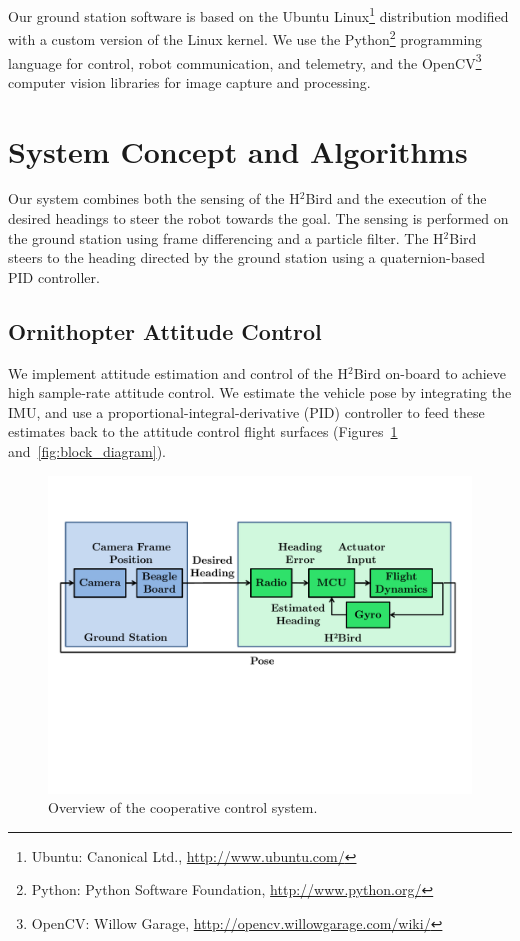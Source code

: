\documentclass{aamas2013}
\begin{document}
Our ground station software is based on the Ubuntu Linux\footnote{\raggedright Ubuntu: 
Canonical Ltd., \href{http://www.ubuntu.com/}{http://www.ubuntu.com/}} distribution
modified with a custom version of the Linux kernel. 
We use the Python\footnote{\raggedright Python: Python Software Foundation, \href{http://www.python.org/}
{http://www.python.org/}} programming language for control, robot 
communication, and telemetry, and the OpenCV\footnote{\raggedright OpenCV: Willow Garage, 
\href{http://opencv.willowgarage.com/wiki/}{http://opencv.willowgarage.com/wiki/}} 
computer vision libraries for image capture and processing.

\section{System Concept and Algorithms}

Our system combines both the sensing of the H$^2$Bird and the execution of the
desired headings to steer the robot towards the goal. The sensing is performed
on the ground station using frame differencing and a particle filter. The
H$^2$Bird steers to the heading directed by the ground station using a
quaternion-based PID controller.

\subsection{Ornithopter Attitude Control}

We implement attitude estimation and control of the H$^2$Bird on-board to 
achieve high sample-rate attitude control. We estimate the vehicle pose by
integrating the IMU, and use a proportional-integral-derivative (PID) 
controller to feed these estimates back to the attitude control flight 
surfaces (Figures~\ref{fig:process_flow} and~\ref{fig:block_diagram}).

\begin{figure}[tb]
\centering
\includegraphics[width=\linewidth]{figures/process_flow.pdf}
\caption{Overview of the cooperative control system.}
\label{fig:process_flow}
\end{figure}
\end{document}

